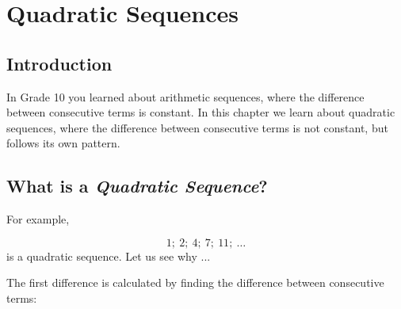 \chapter{Quadratic Sequences}
\label{m:pin:g11}


\section{Introduction}
In Grade 10 you learned about arithmetic sequences, where the
difference between consecutive terms is constant. In this chapter we
learn about quadratic sequences, where the difference between
consecutive terms is not constant, but follows its own pattern.


\section{What is a \textit{Quadratic Sequence}?}


For example, 

\begin{equation}
\label{eq:mp:s:quadseq:1}
1; \: 2; \: 4; \: 7; \: 11; \: \ldots
\end{equation}
is a quadratic sequence. Let us see why ... 

The first difference is calculated by finding the difference between consecutive terms:

